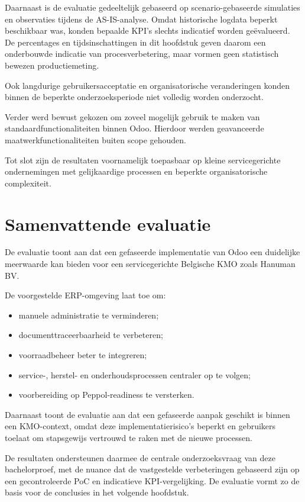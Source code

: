 Daarnaast is de evaluatie gedeeltelijk gebaseerd op scenario-gebaseerde simulaties en observaties tijdens de AS-IS-analyse. Omdat historische logdata beperkt beschikbaar was, konden bepaalde KPI's slechts indicatief worden geëvalueerd. De percentages en tijdsinschattingen in dit hoofdstuk geven daarom een onderbouwde indicatie van procesverbetering, maar vormen geen statistisch bewezen productiemeting.

Ook langdurige gebruikersacceptatie en organisatorische veranderingen konden binnen de beperkte onderzoeksperiode niet volledig worden onderzocht.

Verder werd bewust gekozen om zoveel mogelijk gebruik te maken van standaardfunctionaliteiten binnen Odoo. Hierdoor werden geavanceerde maatwerkfunctionaliteiten buiten scope gehouden.

Tot slot zijn de resultaten voornamelijk toepasbaar op kleine servicegerichte ondernemingen met gelijkaardige processen en beperkte organisatorische complexiteit.

\section{Samenvattende evaluatie}
\label{sec:samenvattende-evaluatie}

De evaluatie toont aan dat een gefaseerde implementatie van Odoo een duidelijke meerwaarde kan bieden voor een servicegerichte Belgische KMO zoals Hanuman BV.

De voorgestelde ERP-omgeving laat toe om:
\begin{itemize}
    \item manuele administratie te verminderen;
    \item documenttraceerbaarheid te verbeteren;
    \item voorraadbeheer beter te integreren;
    \item service-, herstel- en onderhoudsprocessen centraler op te volgen;
    \item voorbereiding op Peppol-readiness te versterken.
\end{itemize}

Daarnaast toont de evaluatie aan dat een gefaseerde aanpak geschikt is binnen een KMO-context, omdat deze implementatierisico's beperkt en gebruikers toelaat om stapsgewijs vertrouwd te raken met de nieuwe processen.

De resultaten ondersteunen daarmee de centrale onderzoeksvraag van deze bachelorproef, met de nuance dat de vastgestelde verbeteringen gebaseerd zijn op een gecontroleerde PoC en indicatieve KPI-vergelijking. De evaluatie vormt zo de basis voor de conclusies in het volgende hoofdstuk.